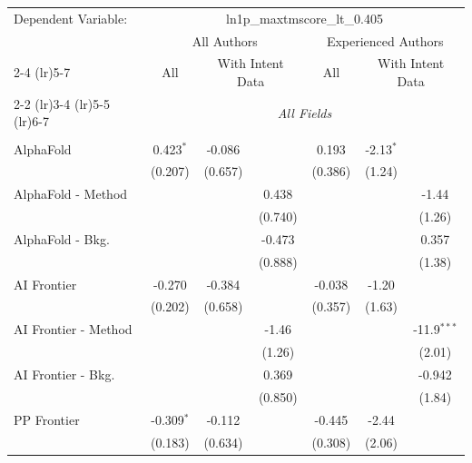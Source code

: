 \begingroup
\centering
\begin{tabular}{lcccccc}
   \tabularnewline \midrule \midrule
   Dependent Variable: & \multicolumn{6}{c}{ln1p\_maxtmscore\_lt\_0.405}\\
 & \multicolumn{3}{c}{All Authors} & \multicolumn{3}{c}{Experienced Authors} \\
\cmidrule(lr){2-4} \cmidrule(lr){5-7}
 & \multicolumn{1}{c}{All} & \multicolumn{2}{c}{With Intent Data} & \multicolumn{1}{c}{All} & \multicolumn{2}{c}{With Intent Data} \\
\cmidrule(lr){2-2} \cmidrule(lr){3-4} \cmidrule(lr){5-5} \cmidrule(lr){6-7}
 & \multicolumn{6}{c}{\textit{All Fields}} \\ \\
   AlphaFold            & 0.423$^{*}$  & -0.086  &         & 0.193   & -2.13$^{*}$ &   \\   
                        & (0.207)      & (0.657) &         & (0.386) & (1.24)      &   \\   
   AlphaFold - Method   &              &         & 0.438   &         &             & -1.44\\   
                        &              &         & (0.740) &         &             & (1.26)\\   
   AlphaFold - Bkg.     &              &         & -0.473  &         &             & 0.357\\   
                        &              &         & (0.888) &         &             & (1.38)\\   
   AI Frontier          & -0.270       & -0.384  &         & -0.038  & -1.20       &   \\   
                        & (0.202)      & (0.658) &         & (0.357) & (1.63)      &   \\   
   AI Frontier - Method &              &         & -1.46   &         &             & -11.9$^{***}$\\   
                        &              &         & (1.26)  &         &             & (2.01)\\   
   AI Frontier - Bkg.   &              &         & 0.369   &         &             & -0.942\\   
                        &              &         & (0.850) &         &             & (1.84)\\   
   PP Frontier          & -0.309$^{*}$ & -0.112  &         & -0.445  & -2.44       &   \\   
                        & (0.183)      & (0.634) &         & (0.308) & (2.06)      &   \\   

\end{tabular}
